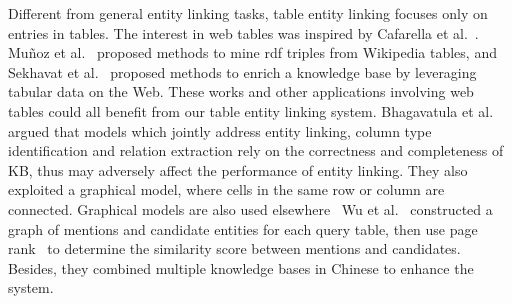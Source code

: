Different from general entity linking tasks, table entity linking focuses 
only on entries in tables. The interest in web tables was inspired by 
Cafarella et al.~. 
Mu{\~n}oz et al.~ proposed methods to mine 
rdf triples from Wikipedia tables, and Sekhavat et al.~ proposed methods to enrich a knowledge base by leveraging tabular data on the Web. These works and other applications involving web tables could 
all benefit from our table entity linking system.
Bhagavatula et al.~ argued that models which 
jointly address entity linking, column type identification and relation 
extraction rely on the correctness and completeness of KB, 
thus may adversely affect the performance of entity linking. 
They also exploited a graphical model, where cells in the same row or column 
are connected. Graphical models are also used elsewhere~\cite{limaye2010annotating,ibrahim2016making}
Wu et al.~ constructed a graph of mentions and 
candidate entities for each query table, then use 
page rank~\cite{page1999pagerank} to determine the similarity score 
between mentions and candidates. Besides, they combined multiple knowledge 
bases in Chinese to enhance the system.

